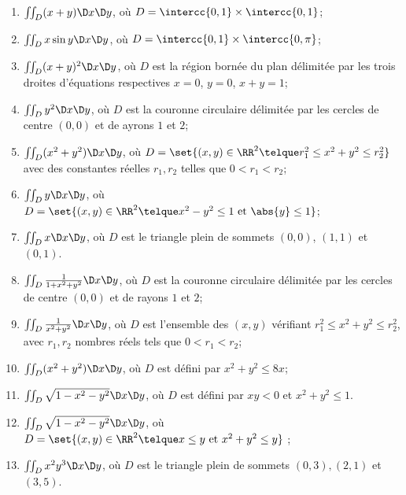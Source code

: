 \documentclass[12pt,french,oneside,a4paper]{memoir} %
\begin{document}
\begin{exo}
\begin{enumerate}
\item $\iint_D (x+y)  \D x \D y$, où $D = \intercc{0,1}\times\intercc{0,1}$;
\item $\iint_D x \sin y  \D x \D y$, où $D = \intercc{0,1}\times \intercc{0,\pi}$;
\item $\iint_D (x+y)^{2}  \D x \D y$, où $D$ est la région bornée du plan délimitée par les trois droites d'équations respectives $x = 0$, $y = 0$, $x+y = 1$;
\item $\iint_D y^{2}  \D x \D y$, où $D$ est la couronne circulaire délimitée par les cercles de centre $(0,0)$ et de ayrons $1$ et $2$;
\item $\iint_D (x^{2}+y^{2}) \D x \D y$, où $D = \set{(x,y) \in  \RR^2\telque r_{1}^{2} \leq x^{2}+y^{2}\leq r_{2}^{2}}$ avec des constantes réelles $r_{1},r_{2}$ telles que $0 < r_{1} < r_{2}$;
\item $\iint_{D} y \D x \D y$, où $D = \set{(x,y) \in \RR^2 \telque x^{2} - y^{2} \leq 1 \text{ et } \abs{y} \leq 1}$;
\item $\iint_{D} x  \D x \D y$, où $D$ est le triangle plein de sommets $(0,0)$, $(1,1)$ et $(0,1)$.
\item $\iint_{D} \frac{1}{1+x^{2}+y^{2}}  \D x \D y$, où $D$ est la couronne circulaire délimitée par les cercles de centre $(0,0)$ et de rayons $1$ et $2$;
\item $\iint_{D} \frac{1}{x^{2}+y^{2}}  \D x \D y$, où $D$ est l'ensemble des $(x,y)$ vérifiant $r_{1}^{2}\leq x^{2}+y^{2} \leq r_{2}^{2}$, avec $r_{1}, r_{2}$ nombres réels tels que $0 < r_{1} < r_{2}$;
\item $\iint_{D} (x^2+y^{2})  \D x \D y$, où $D$ est défini par $x^{2}+y^{2} \leq 8x$;
\item $\iint_{D} \sqrt{1 - x^{2}-y^{2}}  \D x \D y$, où $D$ est défini par $xy < 0$ et $x^{2}+y^{2} \leq 1$.
\item $\iint_{D} \sqrt{1 - x^{2}-y^{2}}  \D x \D y$, où $D = \set{(x,y)\in \RR^2 \telque x \leq y \text{ et } x^{2}+y^{2} \leq y}$ ;
\item $\iint_{D} x^{2}y^{3}  \D x \D y$, où $D$ est le triangle plein de sommets $(0,3), (2,1)$ et $(3,5)$.
\end{enumerate}
\end{exo}
\end{document}
